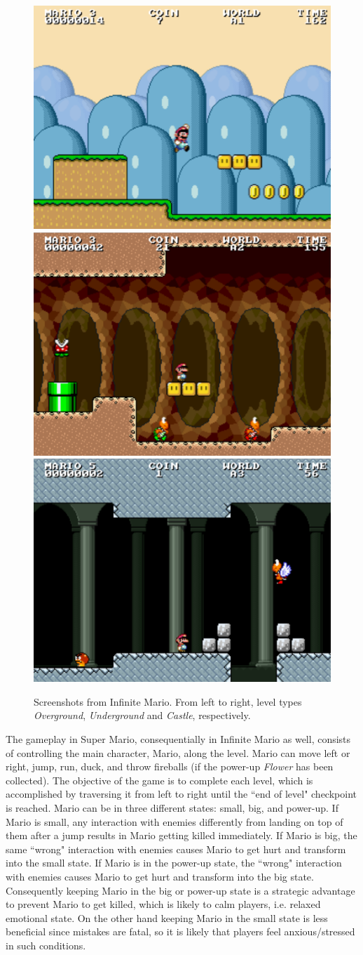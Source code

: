 \begin{figure}[h]
  \centering
  \includegraphics[width=.32\textwidth]{Content/figures/mario-overground}\hfill
  \includegraphics[width=.32\textwidth]{Content/figures/mario-underground}\hfill
  \includegraphics[width=.32\textwidth]{Content/figures/mario-castle}
  \caption{Screenshots from Infinite Mario. From left to right, level types \textit{Overground}, \textit{Underground} and \textit{Castle}, respectively.}
  \label{fig:experiment2-infinite-mario}
\end{figure}

The gameplay in Super Mario, consequentially in Infinite Mario as well, consists of controlling the main character, Mario, along the level. Mario can move left or right, jump, run, duck, and throw fireballs (if the power-up \textit{Flower} has been collected). The objective of the game is to complete each level, which is accomplished by traversing it from left to right until the ``end of level" checkpoint is reached. Mario can be in three different states: small, big, and power-up. If Mario is small, any interaction with enemies differently from landing on top of them after a jump results in Mario getting killed immediately. If Mario is big, the same ``wrong" interaction with enemies causes Mario to get hurt and transform into the small state. If Mario is in the power-up state, the ``wrong" interaction with enemies causes Mario to get hurt and transform into the big state. Consequently keeping Mario in the big or power-up state is a strategic advantage to prevent Mario to get killed, which is likely to calm players, i.e. relaxed emotional state. On the other hand keeping Mario in the small state is less beneficial since mistakes are fatal, so it is likely that players feel anxious/stressed in such conditions.

